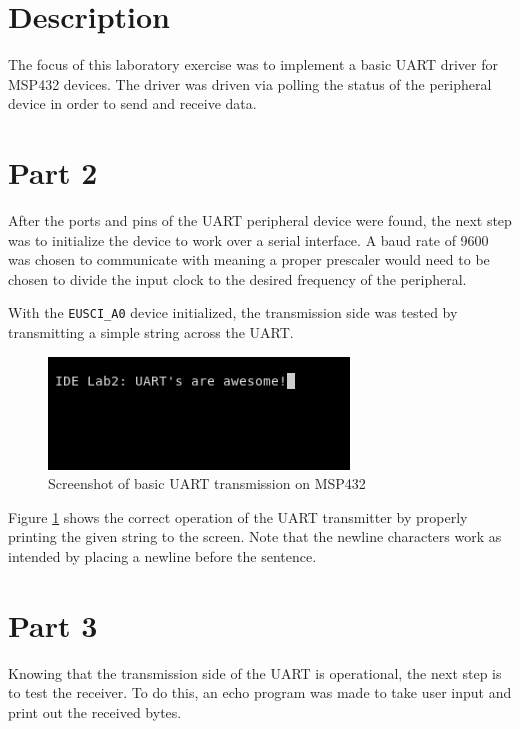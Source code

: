 \documentclass[CMPE]{../KGCOEReport}
\def\code#1{\texttt{#1}}
\begin{document}
    \maketitle
    \section*{Description}

    The focus of this laboratory exercise was to implement a basic UART driver for
    MSP432 devices. The driver was driven via polling the status of the peripheral device
    in order to send and receive data.

    \section*{Part 2}

    After the ports and pins of the UART peripheral device were found, the next step was
    to initialize the device to work over a serial interface. A baud rate of 9600 was chosen
    to communicate with meaning a proper prescaler would need to be chosen to divide the
    input clock to the desired frequency of the peripheral.

    With the \code{EUSCI\_A0} device initialized, the transmission side was tested by
    transmitting a simple string across the UART.

    \begin{figure}[h!]
      \centering
      \includegraphics[width=8cm]{part2}
      \caption{Screenshot of basic UART transmission on MSP432}
      \label{fig:part2}
    \end{figure}

    Figure \ref{fig:part2} shows the correct operation of the UART transmitter
    by properly printing the given string to the screen. Note that the newline characters
    work as intended by placing a newline before the sentence.

    \section*{Part 3}

	Knowing that the transmission side of the UART is operational, the next step
	is to test the receiver. To do this, an echo program was made to take user input
	and print out the received bytes.
\end{document}

